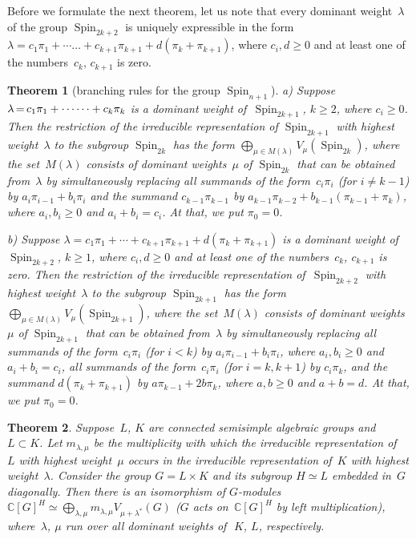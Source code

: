 \documentclass[12pt]{amsart}
\newtheorem{theorem}{Theorem}
\theoremstyle{definition}
\theoremstyle{remark}
\begin{document}
Before we formulate the next theorem, let us note that every
dominant weight~$\lambda$ of the group ${\operatorname{Spin}}_{2k+2}$ is uniquely
expressible in the form $\lambda=c_1\pi_1
+\dotsb\allowbreak\dots+c_{k+1}\pi_{k+1}+d(\pi_k+\pi_{k+1})$, where
$c_i,d{\geqslant}0$ and at least one of the numbers~$c_k$, $c_{k+1}$ is
zero.

\begin{theorem}[{\rm branching rules for the group ${\operatorname{Spin}}_{n+1}$}]
\label{th4} {\rm a)} Suppose $\lambda\,{=}\,
c_1\pi_1+\nobreak\dotsb\allowbreak\dots+c_k\pi_k$ is a dominant
weight of\, ${\operatorname{Spin}}_{2k+1}$, $k{\geqslant}2$, where $c_i{\geqslant}0$. Then the
restriction of the irreducible representation of\; ${\operatorname{Spin}}_{2k+1}$
with highest weight~$\lambda$ to the subgroup ${\operatorname{Spin}}_{2k}$ has the
form $\bigoplus \limits_{\mu\in M(\lambda)}V_\mu({\operatorname{Spin}}_{2k})$, where
the set~$M(\lambda)$ consists of dominant weights~$\mu$ of
${\operatorname{Spin}}_{2k}$ that can be obtained from~$\lambda$ by simultaneously
replacing all summands of the form~$c_i\pi_i$ \textup{(}for $i\ne
k-1$\textup{)} by $a_i\pi_{i-1}+b_i\pi_i$ and the summand
$c_{k-1}\pi_{k-1}$ by $a_{k-1}\pi_{k-2}+b_{k-1}(\pi_{k-1}+\pi_k)$,
where $a_i,b_i{\geqslant}0$ and $a_i+b_i=c_i$. At that, we put $\pi_0=0$.

{\rm b)} Suppose
$\lambda=c_1\pi_1+\cdots+c_{k+1}\pi_{k+1}+d(\pi_k+\pi_{k+1})$ is a
dominant weight of\, ${\operatorname{Spin}}_{2k+2}$, $k{\geqslant}1$, where $c_i,d{\geqslant}0$ and
at least one of the numbers~$c_k$, $c_{k+1}$ is zero. Then the
restriction of the irreducible representation of\, ${\operatorname{Spin}}_{2k+2}$
with highest weight~$\lambda$ to the subgroup ${\operatorname{Spin}}_{2k+1}$ has the
form $\bigoplus \limits_{\mu\in M(\lambda)}V_\mu({\operatorname{Spin}}_{2k+1})$,
where the set~$M(\lambda)$ consists of dominant weights~$\mu$ of
${\operatorname{Spin}}_{2k+1}$ that can be obtained from~$\lambda$ by simultaneously
replacing all summands of the form~$c_i\pi_i$ \textup{(}for $i<
k$\textup{)} by $a_i\pi_{i-1}+b_i\pi_i$, where $a_i,b_i{\geqslant}0$ and
$a_i+b_i=c_i$, all summands of the form~$c_i\pi_i$ \textup{(}for
$i=k,k+1$\textup{)} by $c_i\pi_k$, and the summand
$d(\pi_k+\pi_{k+1})$ by $a\pi_{k-1}+2b\pi_k$, where $a,b{\geqslant}0$ and
$a+b=d$. At that, we put $\pi_0=0$.
\end{theorem}

\begin{theorem}
\label{th5} Suppose~$L$, $K$ are connected semisimple algebraic
groups and $L\subset K$. Let $m_{\lambda,\mu}$ be the multiplicity
with which the irreducible representation of\,~$L$ with highest
weight~$\mu$ occurs in the irreducible representation of~$K$ with
highest weight~$\lambda$. Consider the group $G=L\times K$ and its
subgroup $H\simeq L$ embedded in~$G$ diagonally. Then there is an
isomorphism of $G$-modules $\mathbb{C}[G]^H\simeq \bigoplus
\limits_{\lambda,\mu} m_{\lambda,\mu} V_{\mu+\lambda^*}(G)$
\textup{(}$G$ acts on~$\mathbb{C}[G]^H$ by left
multiplication\textup{)}, where~$\lambda$, $\mu$ run over all
dominant weights of\,~$K$, $L$, respectively.
\end{theorem}
\end{document}
